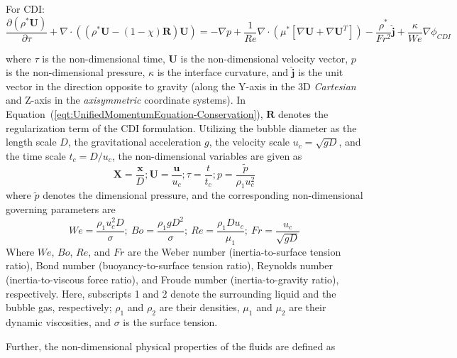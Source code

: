\documentclass[a4paper,fleqn]{cas-sc}
\begin{document}
	\noindent For CDI:
	\begin{equation}\label{eqt:UnifiedMomentumEquation-Conservation}
		\frac{\partial(\rho^{*}\mathbf{U})}{\partial\tau}+\nabla\cdot((\rho^*\mathbf{U}-(1-\chi)\mathbf{R})\mathbf{U})=-\nabla p+\frac{1}{Re}\nabla\cdot(\mu^{*}[\nabla\mathbf{U}+\nabla\mathbf{U}^T])-\frac{\rho^*}{Fr^2}\hat{\mathbf{j}}+\frac{\kappa}{We}\nabla \phi_{CDI}
	\end{equation}
	
	\noindent where $\tau$ is the non-dimensional time, $\mathbf{U}$ is the non-dimensional velocity vector, $p$ is the non-dimensional pressure, $\kappa$ is the interface curvature, and $\hat{\mathbf{j}}$ is the unit vector in the direction opposite to gravity (along the Y-axis in the 3D \textit{Cartesian} and Z-axis in the \textit{axisymmetric} coordinate systems). In Equation~(\ref{eqt:UnifiedMomentumEquation-Conservation}), $\mathbf{R}$ denotes the regularization term of the CDI formulation. Utilizing the bubble diameter as the length scale $D$, the gravitational acceleration $g$, the velocity scale $u_c=\sqrt{gD}$, and the time scale $t_c=D/u_c$, the non-dimensional variables are given as
	\begin{equation*}
		\mathbf{X}=\frac{\mathbf{x}}{D}; \mathbf{U}=\frac{\mathbf{u}}{u_c}; \tau=\frac{t}{t_c}; p=\frac{\tilde{p}}{\rho_1u_c^2}
	\end{equation*}
	where $\tilde{p}$ denotes the dimensional pressure, and the corresponding non-dimensional governing parameters are
	\begin{equation*}
		We=\frac{\rho_1 u_c^2D}{\sigma}; \ Bo=\frac{\rho_1gD^2}{\sigma}; \ Re=\frac{\rho_1Du_c}{\mu_1}; \ Fr=\frac{u_c}{\sqrt{gD}}
	\end{equation*}
	Where $We$, $Bo$, $Re$, and $Fr$ are the Weber number (inertia-to-surface tension ratio), Bond number (buoyancy-to-surface tension ratio), Reynolds number (inertia-to-viscous force ratio), and Froude number (inertia-to-gravity ratio), respectively. Here, subscripts 1 and 2 denote the surrounding liquid and the bubble gas, respectively; $\rho_1$ and $\rho_2$ are their densities, $\mu_1$ and $\mu_2$ are their dynamic viscosities, and $\sigma$ is the surface tension. 
	
	Further, the non-dimensional physical properties of the fluids are defined as
	
\end{document}
